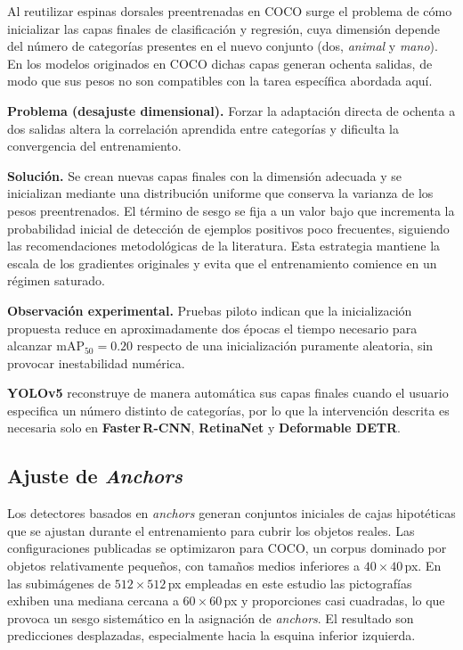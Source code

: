 Al reutilizar espinas dorsales preentrenadas en COCO surge el problema de cómo inicializar las capas finales de clasificación y regresión, cuya dimensión depende del número de categorías presentes en el nuevo conjunto (dos, \emph{animal} y \emph{mano}).
En los modelos originados en COCO dichas capas generan ochenta salidas, de modo que sus pesos no son compatibles con la tarea específica abordada aquí.

\textbf{Problema (desajuste dimensional).}
Forzar la adaptación directa de ochenta a dos salidas altera la correlación aprendida entre categorías y dificulta la convergencia del entrenamiento.

\textbf{Solución.}
Se crean nuevas capas finales con la dimensión adecuada y se inicializan mediante una distribución uniforme que conserva la varianza de los pesos preentrenados.
El término de sesgo se fija a un valor bajo que incrementa la probabilidad inicial de detección de ejemplos positivos poco frecuentes, siguiendo las recomendaciones metodológicas de la literatura.
Esta estrategia mantiene la escala de los gradientes originales y evita que el entrenamiento comience en un régimen saturado.

\textbf{Observación experimental.}
Pruebas piloto indican que la inicialización propuesta reduce en aproximadamente dos épocas el tiempo necesario para alcanzar \(\text{mAP}_{50}=0.20\) respecto de una inicialización puramente aleatoria, sin provocar inestabilidad numérica.

\textbf{YOLOv5} reconstruye de manera automática sus capas finales cuando el usuario especifica un número distinto de categorías, por lo que la intervención descrita es necesaria solo en \textbf{Faster\,R-CNN}, \textbf{RetinaNet} y \textbf{Deformable DETR}.

\subsection{Ajuste de \emph{Anchors}}\label{ssec:anchors}

Los detectores basados en \emph{anchors} generan conjuntos iniciales de cajas hipotéticas que se ajustan durante el entrenamiento para cubrir los objetos reales.
Las configuraciones publicadas se optimizaron para COCO, un corpus dominado por objetos relativamente pequeños, con tamaños medios inferiores a \(40\times40\)\,px.
En las subimágenes de \(512\times512\)\,px empleadas en este estudio las pictografías exhiben una mediana cercana a \(60\times60\)\,px y proporciones casi cuadradas, lo que provoca un sesgo sistemático en la asignación de \emph{anchors}.
El resultado son predicciones desplazadas, especialmente hacia la esquina inferior izquierda.

